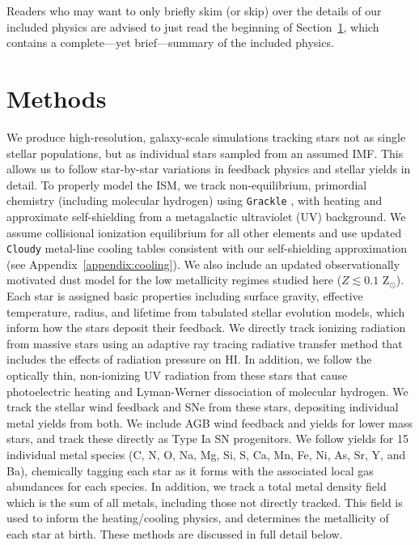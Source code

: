 \documentclass[fleqn,usenatbib,useAMS]{mnras}
\begin{document}
Readers who may want to only briefly skim (or skip) over the details of our included physics are advised to just read the beginning of Section~\ref{sec:methods}, which contains a complete---yet brief---summary of the included physics.

\section{Methods}
\label{sec:methods}
We produce high-resolution, galaxy-scale simulations tracking stars not as single stellar populations, but as individual stars sampled from an assumed IMF.
This allows us to follow star-by-star variations in feedback physics and stellar yields in detail. To properly model the ISM, we track non-equilibrium, primordial chemistry (including molecular hydrogen) using \texttt{Grackle} \citep{GrackleMethod}, with heating and approximate self-shielding from a metagalactic ultraviolet (UV) background. We assume collisional ionization equilibrium for all other elements and use updated \texttt{Cloudy} metal-line cooling tables consistent with our self-shielding approximation (see Appendix~\ref{appendix:cooling}). We also include an updated observationally motivated dust model for the low metallicity regimes studied here ($Z \lesssim 0.1$ Z$_{\odot}$). Each star is assigned basic properties including surface gravity, effective temperature, radius, and lifetime from tabulated stellar evolution models, which inform how the stars deposit their feedback. We directly track ionizing radiation from massive stars using an adaptive ray tracing radiative transfer method that includes the effects of radiation pressure on HI. In addition, we follow the optically thin, non-ionizing UV radiation from these stars that cause photoelectric heating and Lyman-Werner dissociation of molecular hydrogen. We track the stellar wind feedback and SNe from these stars, depositing individual metal yields from both. We include AGB wind feedback and yields for lower mass stars, and track these directly as Type Ia SN progenitors. We follow yields for 15 individual metal species (C, N, O, Na, Mg, Si, S, Ca, Mn, Fe, Ni, As, Sr, Y, and Ba), chemically tagging each star as it forms with the associated local gas abundances for each species. In addition, we track a total metal density field which is the sum of all metals, including those not directly tracked. This field is used to inform the heating/cooling physics, and determines the metallicity of each star at birth. These methods are discussed in full detail below.
\end{document}
